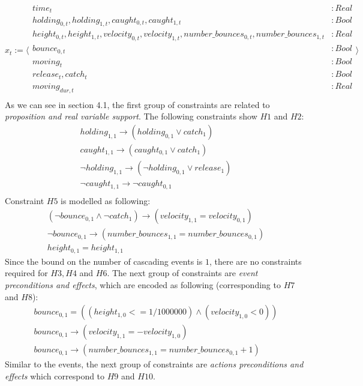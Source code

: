 $$
x_t := \Bigg \langle
\begin{array}{lr}
time_t &:Real\\
holding_{0,t}, holding_{1,t}, caught_{0,t}, caught_{1,t} &:Bool\\
height_{0,t}, height_{1,t}, velocity_{0,t}, velocity_{1,t} , number\_bounces_{0,t}, number\_bounces_{1,t} &:Real\\ 
bounce_{0,t}&:Bool\\
moving_{t}&:Bool\\
release_{t}, catch_{t}  &:Bool\\
moving_{dur,t}  &:Real\\
\end{array}
\Bigg \rangle
$$
As we can see in section 4.1, the first group of constraints are related to \emph{proposition and real variable support}. The following constraints show $H1$ and $H2$:
$$
\begin{array}{l}
holding_{1,1} \rightarrow (holding_{0,1} \vee catch_{1})\\
caught_{1,1} \rightarrow (caught_{0,1} \vee catch_{1})\\
\neg holding_{1,1} \rightarrow (\neg holding_{0,1} \vee release_{1})\\
\neg caught_{1,1} \rightarrow \neg caught_{0,1}\\
\end{array}
$$
Constraint $H5$ is modelled as following: 
$$
\begin{array}{l}
(\neg bounce_{0,1} \wedge \neg catch_{1}) \rightarrow (velocity_{1,1} = velocity_{0,1})\\
\neg bounce_{0,1} \rightarrow (number\_bounces_{1,1} = number\_bounces_{0,1})\\
height_{0,1} = height_{1,1}
\end{array}
$$
Since the bound on the number of cascading events is $1$, there are no constraints required for  $H3,H4$ and $H6$. The next group of constraints are \emph{event preconditions and effects}, which are encoded as following (corresponding to $H7$ and $H8$):
$$
\begin{array}{l}
bounce_{0,1} = ((height_{1,0} <= 1/1000000) \wedge (velocity_{1,0} < 0))\\
bounce_{0,1} \rightarrow (velocity_{1,1} = -velocity_{1,0})\\
bounce_{0,1} \rightarrow (number\_bounces_{1,1} = number\_bounces_{0,1} + 1)
\end{array}
$$
Similar to the events, the next group of constraints are \emph{actions preconditions and effects} which correspond to $H9$ and $H10$.
